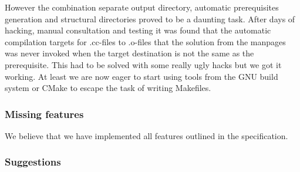 \documentclass[10pt, a4paper]{article}
\begin{document}
However the combination separate output directory, automatic prerequisites generation and structural directories proved to be a daunting task. After days of hacking, manual consultation and testing it was found that the automatic compilation targets for .cc-files to .o-files that the solution from the manpages was never invoked when the target destination is not the same as the prerequisite. This had to be solved with some really ugly hacks but we got it working. At least we are now eager to start using tools from the GNU build system or CMake to escape the task of writing Makefiles.


\subsubsection{Missing features}
We believe that we have implemented all features outlined in the specification.

\subsubsection{Suggestions}




\emph{\cite{dummy+ref}} 
\newpage


\end{document}
